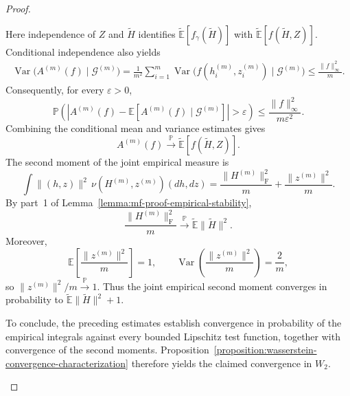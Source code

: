 \begin{proof}
\begin{enumerate}[wide]
\[            \]
            Here independence of $Z$ and $\tilde H$ identifies
            $\tilde{\mathbb E}[f_\gamma(\tilde H)]$ with
            $\tilde{\mathbb E}[f(\tilde H,Z)]$.
            Conditional independence also yields
            \[
            \begin{aligned}
                \operatorname{Var}
                \bigl(A^{(m)}(f)\mid\mathcal G^{(m)}\bigr)
                =
                \frac1{m^2}\sum_{i=1}^m
                \operatorname{Var}
                \bigl(f(h_i^{(m)},z_i^{(m)})
                      \mid\mathcal G^{(m)}\bigr)
                \leq\frac{\|f\|_\infty^2}{m}.
            \end{aligned}
            \]
            Consequently, for every $\varepsilon>0$,
            \[
                \mathbb P\left(
                    \left|
                        A^{(m)}(f)
                        -\mathbb E[A^{(m)}(f)\mid\mathcal G^{(m)}]
                    \right|>\varepsilon
                \right)
                \leq\frac{\|f\|_\infty^2}{m\varepsilon^2}.
            \]
            Combining the conditional mean and variance estimates gives
            \[
                A^{(m)}(f)
                \xrightarrow{\mathbb P}
                \tilde{\mathbb E}[f(\tilde H,Z)].
            \]
            The second moment of the joint empirical measure is
            \[
                \int\|(h,z)\|^2\,\nu(H^{(m)},z^{(m)})(dh,dz)
                =
                \frac{\|H^{(m)}\|_{\mathrm F}^2}{m}
                +\frac{\|z^{(m)}\|^2}{m}.
            \]
            By part~1 of
            Lemma~\ref{lemma:mf-proof-empirical-stability},
            \[
                \frac{\|H^{(m)}\|_{\mathrm F}^2}{m}
                \xrightarrow{\mathbb P}
                \tilde{\mathbb E}\|\tilde H\|^2.
            \]
            Moreover,
            \[
                \mathbb E\left[\frac{\|z^{(m)}\|^2}{m}\right]=1,
                \qquad
                \operatorname{Var}\left(
                    \frac{\|z^{(m)}\|^2}{m}
                \right)=\frac2m,
            \]
            so $\|z^{(m)}\|^2/m\xrightarrow{\mathbb P}1$.
            Thus the joint empirical second moment converges in
            probability to $\tilde{\mathbb E}\|\tilde H\|^2+1$.
        
            To conclude, the preceding estimates establish convergence
            in probability of the empirical integrals against every
            bounded Lipschitz test function, together with convergence
            of the second moments.
            Proposition~\ref{proposition:wasserstein-convergence-characterization}
            therefore yields the claimed convergence in $W_2$.
        

\end{enumerate}
\end{proof}
